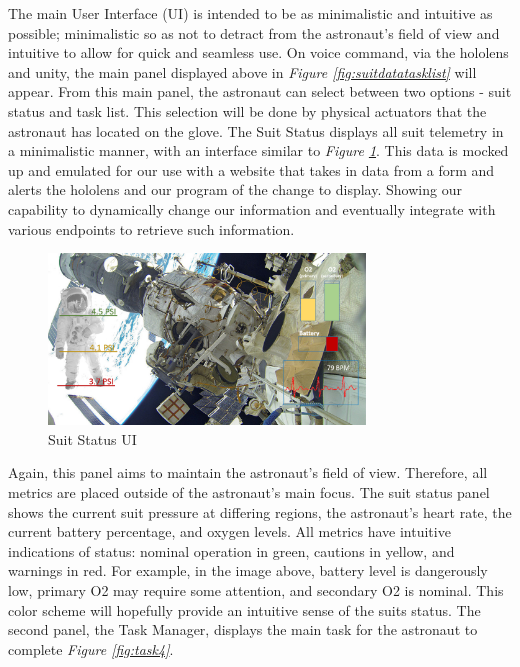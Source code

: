 \documentclass{article}
\begin{document}
The main User Interface (UI) is intended to be as minimalistic and intuitive as possible; minimalistic so as not to detract from the astronaut’s field of view and intuitive to allow for quick and seamless use. On voice command, via the hololens and unity, the main panel displayed above in \textit{Figure \ref{fig:suitdatatasklist}} will appear. From this main panel, the astronaut can select between two options - suit status and task list. This selection will be done by physical actuators that the astronaut has located on the glove. The Suit Status displays all suit telemetry in a minimalistic manner, with an interface similar to \textit{Figure \ref{fig:moresuitmetrics}}. This data is mocked up and emulated for our use with a website that takes in data from a form and alerts the hololens and our program of the change to display. Showing our capability to dynamically change our information and eventually integrate with various endpoints to retrieve such information.

\begin{figure}[!htb]
  \centering
  \includegraphics[width=0.75\textwidth]{assets/moresuitmetrics.png}
  \caption{Suit Status UI}
  \label{fig:moresuitmetrics}
\end{figure}

Again, this panel aims to maintain the astronaut’s field of view. Therefore, all metrics are placed outside of the astronaut’s main focus. The suit status panel shows the current suit pressure at differing regions, the astronaut’s heart rate, the current battery percentage, and oxygen levels. All metrics have intuitive indications of status: nominal operation in green, cautions in yellow, and warnings in red. For example, in the image above, battery level is dangerously low, primary O2 may require some attention, and secondary O2 is nominal. This color scheme will hopefully provide an intuitive sense of the suits status. The second panel, the Task Manager, displays the main task for the astronaut to complete \textit{Figure \ref{fig:task4}}.
\end{document}
